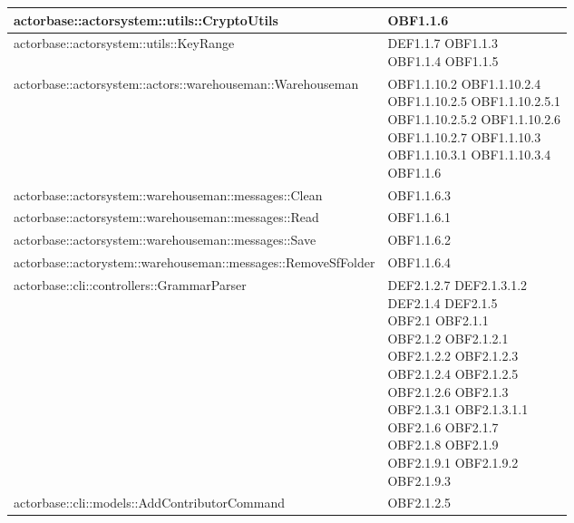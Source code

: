 \documentclass{scalatekids-article}
\begin{document}
\begin{longtable}[H]{|p{12cm}|p{5.5cm}|}
  \hline
  actorbase::actorsystem::utils::CryptoUtils & \multiLineCell[t]{OBF1.1.6\\}\\
  \hline
  actorbase::actorsystem::utils::KeyRange & \multiLineCell[t]{DEF1.1.7 OBF1.1.3\\OBF1.1.4 OBF1.1.5\\}\\
  \hline
  actorbase::actorsystem::actors::warehouseman::Warehouseman & \multiLineCell[t]{OBF1.1.10.2 OBF1.1.10.2.4\\OBF1.1.10.2.5 OBF1.1.10.2.5.1\\OBF1.1.10.2.5.2 OBF1.1.10.2.6\\OBF1.1.10.2.7 OBF1.1.10.3\\OBF1.1.10.3.1 OBF1.1.10.3.4\\OBF1.1.6}\\
  \hline
  actorbase::actorsystem::warehouseman::messages::Clean & \multiLineCell[t]{OBF1.1.6.3\\}\\
  \hline
  actorbase::actorsystem::warehouseman::messages::Read & \multiLineCell[t]{OBF1.1.6.1\\}\\
  \hline
  actorbase::actorsystem::warehouseman::messages::Save & \multiLineCell[t]{OBF1.1.6.2\\}\\
  \hline
  actorbase::actorystem::warehouseman::messages::RemoveSfFolder & \multiLineCell[t]{OBF1.1.6.4\\}\\
  \hline
  actorbase::cli::controllers::GrammarParser & \multiLineCell[t]{DEF2.1.2.7 DEF2.1.3.1.2\\DEF2.1.4 DEF2.1.5\\OBF2.1 OBF2.1.1\\OBF2.1.2 OBF2.1.2.1\\OBF2.1.2.2 OBF2.1.2.3\\OBF2.1.2.4 OBF2.1.2.5\\OBF2.1.2.6 OBF2.1.3\\OBF2.1.3.1 OBF2.1.3.1.1\\OBF2.1.6 OBF2.1.7\\OBF2.1.8 OBF2.1.9\\OBF2.1.9.1 OBF2.1.9.2\\OBF2.1.9.3}\\
  \hline
  actorbase::cli::models::AddContributorCommand & \multiLineCell[t]{OBF2.1.2.5\\}\\
  \hline

\end{longtable}
\end{document}
